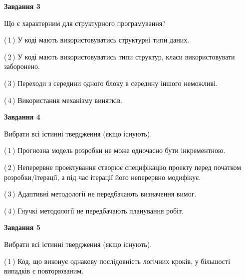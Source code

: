 \documentclass[10pt, ukrainian]{article}
\begin{document}
{\begin {large}
{\begin {center}\textbf{Завдання 3}\end {center}}\par
Що є характерним для структурного програмування?\par
\vspace{2mm}



(\,1\,) У коді мають використовуватись структурні типи даних. %



(\,2\,) У коді мають використовуватись типи структур, класи використовувати заборонено. %



(\,3\,) Переходи з середини одного блоку в середину іншого неможливі. %



(\,4\,) Використання механізму винятків. %


{\begin {center}\textbf{Завдання 4}\end {center}}\par
Вибрати всі істинні твердження (якщо існують).\par
\vspace{2mm}



(\,1\,) Прогнозна модель розробки не може одночасно бути інкрементною. %



(\,2\,) Неперервне проектування створює специфікацію проекту перед початком розробки/ітерації, а під час ітерації його неперервно модифікує.%



(\,3\,) Адаптивні методології не передбачають визначення вимог. %



(\,4\,) Гнучкі методології не передбачають планування робіт. %


{\begin {center}\textbf{Завдання 5}\end {center}}\par
Вибрати всі істинні твердження (якщо існують).\par
\vspace{2mm}



(\,1\,) Код, що виконує однакову послідовність логічних кроків, у більшості випадків є повторюваним.%




\end{large}}
\end{document}
